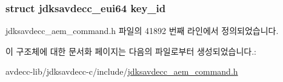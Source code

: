 \subsubsection[{\texorpdfstring{key\+\_\+id}{key_id}}]{\setlength{\rightskip}{0pt plus 5cm}struct {\bf jdksavdecc\+\_\+eui64} key\+\_\+id}\hypertarget{structjdksavdecc__aem__command__enable__stream__encryption_a37cbdf6056556ccfaee3ab01dc7c3032}{}\label{structjdksavdecc__aem__command__enable__stream__encryption_a37cbdf6056556ccfaee3ab01dc7c3032}


jdksavdecc\+\_\+aem\+\_\+command.\+h 파일의 41892 번째 라인에서 정의되었습니다.



이 구조체에 대한 문서화 페이지는 다음의 파일로부터 생성되었습니다.\+:\begin{DoxyCompactItemize}
\item 
avdecc-\/lib/jdksavdecc-\/c/include/\hyperlink{jdksavdecc__aem__command_8h}{jdksavdecc\+\_\+aem\+\_\+command.\+h}\end{DoxyCompactItemize}
